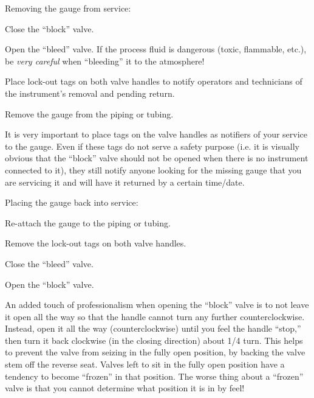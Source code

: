 





Removing the gauge from service:

\medskip
{\item{} Close the ``block'' valve.
{\item{} Open the ``bleed'' valve.  If the process fluid is dangerous (toxic, flammable, etc.), be {\it very careful} when ``bleeding'' it to the atmosphere!
{\item{} Place lock-out tags on both valve handles to notify operators and technicians of the instrument's removal and pending return.
{\item{} Remove the gauge from the piping or tubing.
\medskip

It is very important to place tags on the valve handles as notifiers of your service to the gauge.  Even if these tags do not serve a safety purpose (i.e. it is visually obvious that the ``block'' valve should not be opened when there is no instrument connected to it), they still notify anyone looking for the missing gauge that you are servicing it and will have it returned by a certain time/date.

\vskip 10pt

Placing the gauge back into service:

\medskip
{\item{} Re-attach the gauge to the piping or tubing.
{\item{} Remove the lock-out tags on both valve handles.
{\item{} Close the ``bleed'' valve.
{\item{} Open the ``block'' valve.
\medskip

An added touch of professionalism when opening the ``block'' valve is to not leave it open all the way so that the handle cannot turn any further counterclockwise.  Instead, open it all the way (counterclockwise) until you feel the handle ``stop,'' then turn it back clockwise (in the closing direction) about 1/4 turn.  This helps to prevent the valve from seizing in the fully open position, by backing the valve stem off the reverse seat.  Valves left to sit in the fully open position have a tendency to become ``frozen'' in that position.  The worse thing about a ``frozen'' valve is that you cannot determine what position it is in by feel!






}}}}}}}}
